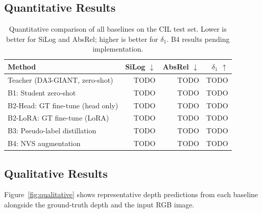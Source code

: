 \documentclass{article}
\begin{document}
\subsection{Quantitative Results}

\begin{table}[h]
\centering
\caption{Quantitative comparison of all baselines on the CIL test set. Lower is better for SiLog and AbsRel; higher is better for $\delta_1$. B4 results pending implementation.}
\label{tab:main}
\begin{tabular}{lrrr}
\toprule
Method & SiLog $\downarrow$ & AbsRel $\downarrow$ & $\delta_1$ $\uparrow$ \\
\midrule
Teacher (DA3-GIANT, zero-shot)       & TODO & TODO & TODO \\
\midrule
B1: Student zero-shot                & TODO & TODO & TODO \\
B2-Head: GT fine-tune (head only)    & TODO & TODO & TODO \\
B2-LoRA: GT fine-tune (LoRA)         & TODO & TODO & TODO \\
B3: Pseudo-label distillation        & TODO & TODO & TODO \\
B4: NVS augmentation                 & TODO & TODO & TODO \\
\bottomrule
\end{tabular}
\end{table}

\subsection{Qualitative Results}

Figure~\ref{fig:qualitative} shows representative depth predictions from each baseline alongside the ground-truth depth and the input RGB image.
\end{document}
